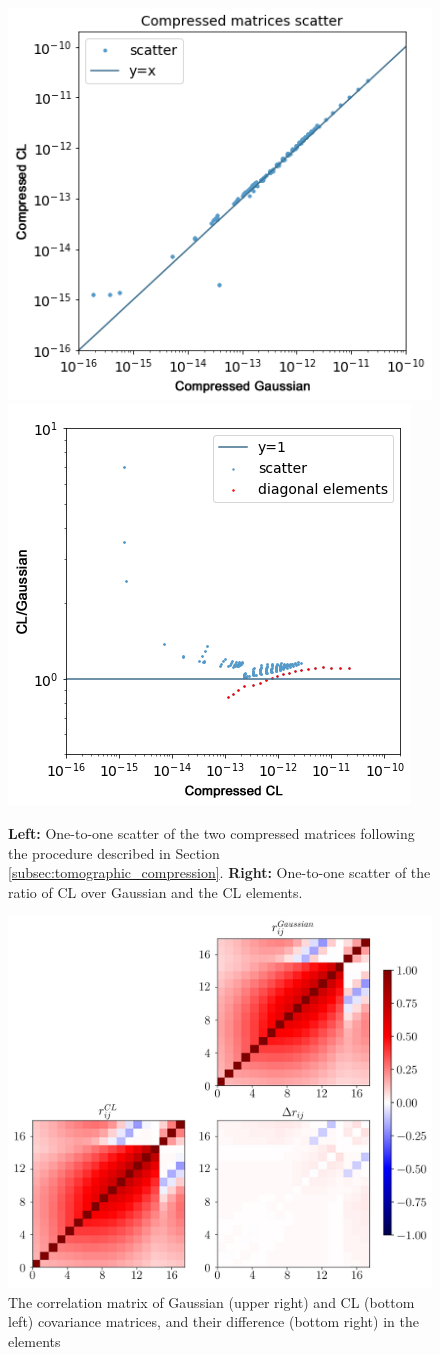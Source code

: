 \documentclass[twocolumn]{\docclass}
\begin{document}
	\begin{figure}
	\includegraphics[width=0.48\columnwidth]{kl_scatter_updated.png}
	\includegraphics[width=0.45\columnwidth]{comp_ratio_kl_updated.png}
	\caption{ \textbf{Left:}  One-to-one scatter of the two compressed matrices following the procedure described in Section \ref{subsec:tomographic_compression}.  \textbf{Right:}  One-to-one scatter of the ratio of CL over Gaussian and the CL elements. \label{fig:comp-cov}}
	\end{figure}

	\begin{figure}
	\includegraphics[width=0.8\columnwidth]{corr_diag_kl.pdf}
	\caption{The correlation matrix of Gaussian (upper right) and CL (bottom left) covariance matrices, and their difference (bottom right) in the elements \label{fig:kl_corr}}
	\end{figure}
	
\end{document}
